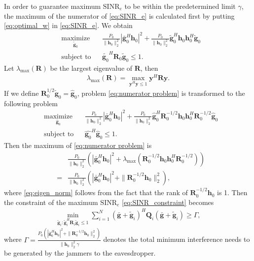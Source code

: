 \documentclass[conference]{IEEEtran}
\begin{document}
In order to guarantee maximum $\mathrm{SINR}_e$ to be within the predetermined limit $\gamma$, the maximum of the numerator of \eqref{eq:SINR_e} is calculated first by putting \eqref{eq:optimal_w} in \eqref{eq:SINR_e}. We obtain
\begin{equation}
\begin{aligned} \label{eq:numerator problem}
& \underset{\tilde{\mathbf{g}}_{0}}{\text{maximize}}
& & \frac{P_0}{\|\mathbf{h}_0\|_2^2}|\bar{\mathbf{g}}_0^H\mathbf{h}_0|^2 +\frac{P_0}{\|\mathbf{h}_0\|_2^2} \tilde{\mathbf{g}}_0^H\mathbf{h}_0\mathbf{h}_0^H\tilde{\mathbf{g}}_0 \\
& \text{subject to}
& & \tilde{\mathbf{g}_0}^H\mathbf{R}_0\tilde{\mathbf{g}}_0 \leq 1.
\end{aligned}
\end{equation}
Let $\lambda_{\mathrm{max}}(\mathbf{R})$ be the largest eigenvalue of $\mathbf{R}$, then
\begin{eqnarray}
\lambda_{\mathrm{max}}(\mathbf{R})= \max_{\mathbf{y}^H\mathbf{y} \leq 1} \mathbf{y}^H\mathbf{R}\mathbf{y}.
\end{eqnarray}
If we define $\mathbf{R}_0^{1/2}\tilde{\mathbf{g}}_0 = \hat{\mathbf{g}}_0$, problem \eqref{eq:numerator problem} is transformed to the following problem
\begin{equation}
\begin{aligned} \label{eq:numerator problem1}
& \underset{\hat{\mathbf{g}}_{0}}{\text{maximize}}
& & \frac{P_0}{\|\mathbf{h}_0\|_2^2}|\bar{\mathbf{g}}_0^H\mathbf{h}_0|^2 +\frac{P_0}{\|\mathbf{h}_0\|_2^2} \hat{\mathbf{g}}_0^H\mathbf{R}_0^{-1/2}\mathbf{h}_0\mathbf{h}_0^H\mathbf{R}_0^{-1/2}\hat{\mathbf{g}}_0 \\
& \text{subject to}
& & \hat{\mathbf{g}_0}^H\hat{\mathbf{g}}_0 \leq 1.
\end{aligned}
\end{equation}
Then the maximum of \eqref{eq:numerator problem} is
\begin{eqnarray}
&&\frac{P_0}{\|\mathbf{h}_0\|_2^2}\left(|\bar{\mathbf{g}}_0^H\mathbf{h}_0|^2 + \lambda_{\mathrm{max}}(\mathbf{R}_0^{-1/2}\mathbf{h}_0\mathbf{h}_0^H\mathbf{R}_0^{-1/2})\right)\\
&=&\frac{P_0}{\|\mathbf{h}_0\|_2^2}\left(|\bar{\mathbf{g}}_0^H\mathbf{h}_0|^2 + \|\mathbf{R}_0^{-1/2}\mathbf{h}_0\|_2^2\right)\label{eq:eigen_norm},
\end{eqnarray} 
where \eqref{eq:eigen_norm} follows from the fact that the rank of $\mathbf{R}_0^{-1/2}\mathbf{h}_0$ is 1. Then the constraint of the maximum $\mathrm{SINR}_e$ \eqref{eq:SINR_constraint}  becomes
\begin{eqnarray}
\min_{\tilde{\mathbf{g}}_i: \tilde{\mathbf{g}}_i^H \mathbf{R}_i\tilde{\mathbf{g}}_i \leq 1}\sum_{i=1}^{N}(\bar{\mathbf{g}}+\tilde{\mathbf{g}}_i)^H\mathbf{Q}_i(\bar{\mathbf{g}}+\tilde{\mathbf{g}}_i) \geq \Gamma  \label{eq:artificial noise constraint},
\end{eqnarray}
where $\Gamma =\frac{P_0\left(|\bar{\mathbf{g}}_0^H\mathbf{h}_0|^2 + \|\mathbf{R}_0^{-1/2}\mathbf{h}_0\|_2^2\right)}{\|\mathbf{h}_0\|_2^2\gamma}$ denotes the total minimum interference needs to be generated by the jammers to the eavesdropper.
\end{document}

